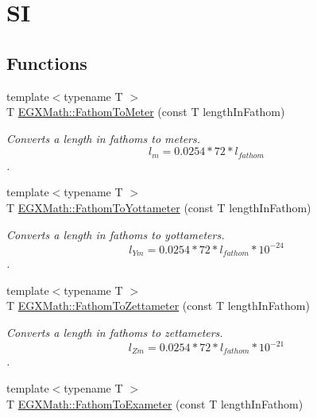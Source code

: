 \hypertarget{group___e_g_x_math-_conversions-_length_conversions-_imperial-_fathom-_s_i}{}\section{SI}
\label{group___e_g_x_math-_conversions-_length_conversions-_imperial-_fathom-_s_i}
\subsection*{Functions}
\begin{DoxyCompactItemize}
\item 
{\footnotesize template$<$typename T $>$ }\\T \mbox{\hyperlink{group___e_g_x_math-_conversions-_length_conversions-_imperial-_fathom-_s_i_ga10d9caaa366193cb8c3b086cfc47a56d}{E\+G\+X\+Math\+::\+Fathom\+To\+Meter}} (const T length\+In\+Fathom)
\begin{DoxyCompactList}\small\item\em Converts a length in fathoms to meters. \[ l_{m}=0.0254 * 72 * l_{fathom} \]. \end{DoxyCompactList}\item 
{\footnotesize template$<$typename T $>$ }\\T \mbox{\hyperlink{group___e_g_x_math-_conversions-_length_conversions-_imperial-_fathom-_s_i_ga0f5e5e4cd705f904b759f069f8926aa3}{E\+G\+X\+Math\+::\+Fathom\+To\+Yottameter}} (const T length\+In\+Fathom)
\begin{DoxyCompactList}\small\item\em Converts a length in fathoms to yottameters. \[ l_{Ym}=0.0254 * 72 * l_{fathom} * 10^{-24} \]. \end{DoxyCompactList}\item 
{\footnotesize template$<$typename T $>$ }\\T \mbox{\hyperlink{group___e_g_x_math-_conversions-_length_conversions-_imperial-_fathom-_s_i_ga3a5da531076421441774a6c7ac72bcc8}{E\+G\+X\+Math\+::\+Fathom\+To\+Zettameter}} (const T length\+In\+Fathom)
\begin{DoxyCompactList}\small\item\em Converts a length in fathoms to zettameters. \[ l_{Zm}=0.0254 * 72 * l_{fathom} * 10^{-21} \]. \end{DoxyCompactList}\item 
{\footnotesize template$<$typename T $>$ }\\T \mbox{\hyperlink{group___e_g_x_math-_conversions-_length_conversions-_imperial-_fathom-_s_i_gaf1d241e8c22ec6118c78924886dcd977}{E\+G\+X\+Math\+::\+Fathom\+To\+Exameter}} (const T length\+In\+Fathom)

\end{DoxyCompactItemize}
